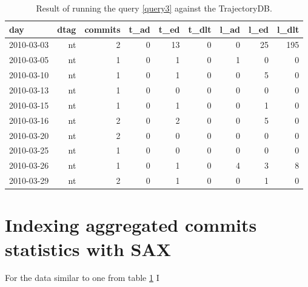 \documentclass[a4paper,10pt]{article}
\numberwithin{equation}{subsection}
\begin{document}
\begin{table}[h]
  \label{tab:third}
  \caption{Result of running the query \ref{query3} against the TrajectoryDB.}
  \begin{tabularx}{400pt}{ | X | r | r | r | r | r | r | r | r |}
  \hline           
day & dtag & commits & t\_ad & t\_ed & t\_dlt & l\_ad & l\_ed & l\_dlt\\ 
\hline           
2010-03-03 & nt & 2 & 0 & 13 & 0 & 0 & 25 & 195\\ 
2010-03-05 & nt & 1 & 0 & 1 & 0 & 1 & 0 & 0\\ 
2010-03-10 & nt & 1 & 0 & 1 & 0 & 0 & 5 & 0\\ 
2010-03-13 & nt & 1 & 0 & 0 & 0 & 0 & 0 & 0\\ 
2010-03-15 & nt & 1 & 0 & 1 & 0 & 0 & 1 & 0\\ 
2010-03-16 & nt & 2 & 0 & 2 & 0 & 0 & 5 & 0\\ 
2010-03-20 & nt & 2 & 0 & 0 & 0 & 0 & 0 & 0\\ 
2010-03-25 & nt & 1 & 0 & 0 & 0 & 0 & 0 & 0\\ 
2010-03-26 & nt & 1 & 0 & 1 & 0 & 4 & 3 & 8\\ 
2010-03-29 & nt & 2 & 0 & 1 & 0 & 0 & 1 & 0\\
\hline    
  \end{tabularx}
\end{table}
\clearpage

\section{Indexing aggregated commits statistics with SAX}
For the data similar to one from table \ref{tab:third} I
\end{document}
